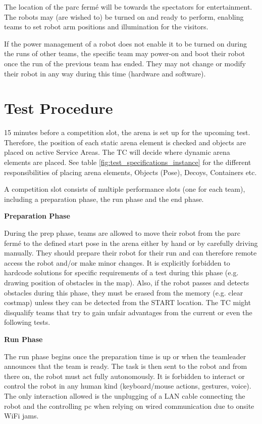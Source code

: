 The location of the parc ferm\'e will be towards the spectators for entertainment.
The robots may (are wished to) be turned on and ready to perform, enabling teams to set robot arm positions and illumination for the visitors. 

If the power management of a robot does not enable it to be turned on during the runs of other teams,
the specific team may power-on and boot their robot once the run of the previous team has ended.
They may not change or modify their robot in any way during this time (hardware and software).

\section{Test Procedure}

15 minutes before a competition slot, the arena is set up for the upcoming test.
Therefore, the position of each static arena element is checked and objects are placed on active 
Service Areas.
The TC will decide where dynamic arena elements are placed. See table \ref{fig:test_specifications_instance} for the different responsibilities of placing arena elements, Objects (Pose), Decoys, Containers etc.

A competition slot consists of multiple performance slots (one for each team), 
including a preparation phase, the run phase and the end phase.

\textbf{Preparation Phase}

During the prep phase, teams are allowed to move their robot from the parc ferm\'e to the defined start pose in the arena either by hand or by carefully driving manually. They should prepare their robot for their run and can therefore remote access the robot and/or make minor changes.
It is explicitly forbidden to hardcode solutions for specific requirements of a test during this phase (e.g. drawing position of obstacles in the map). Also, if the robot passes and detects obstacles during this phase, they must be erased from the memory (e.g. clear costmap) unless they can be detected from the START location. The TC might disqualify teams that try to gain unfair advantages from the current or even the following tests.



\textbf{Run Phase}

The run phase begins once the preparation time is up or when the teamleader announces that the team is ready. 
The task is then sent to the robot and from there on, the robot must act fully autonomously. 
It is forbidden to interact or control the robot in any human kind (keyboard/mouse actions, gestures, voice). 
The only interaction allowed is the unplugging of a LAN cable connecting the robot and the controlling pc
when relying on wired communication due to onsite WiFi jams.

